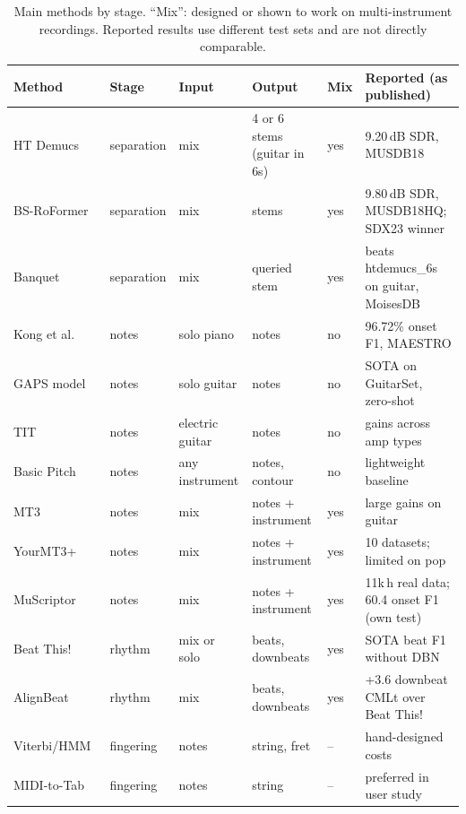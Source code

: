 \begin{table}[t]
\centering
\caption{Main methods by stage. ``Mix'': designed or shown to work on
multi-instrument recordings. Reported results use different test sets and are
not directly comparable.}
\label{tab:methods}
\footnotesize
\setlength{\tabcolsep}{3.5pt}
\begin{tabular}{@{}llllll@{}}
\toprule
Method & Stage & Input & Output & Mix & Reported (as published) \\
\midrule
HT Demucs~\cite{rouard2023htdemucs} & separation & mix & 4 or 6 stems (guitar in 6s) & yes & 9.20\,dB SDR, MUSDB18 \\
BS-RoFormer~\cite{lu2023bsroformer} & separation & mix & stems & yes & 9.80\,dB SDR, MUSDB18HQ; SDX23 winner \\
Banquet~\cite{watcharasupat2024banquet} & separation & mix & queried stem & yes & beats htdemucs\_6s on guitar, MoisesDB \\
Kong et al.~\cite{kong2021highres} & notes & solo piano & notes & no & 96.72\% onset F1, MAESTRO \\
GAPS model~\cite{riley2024gaps} & notes & solo guitar & notes & no & SOTA on GuitarSet, zero-shot \\
TIT~\cite{chen2025egdbpg} & notes & electric guitar & notes & no & gains across amp types \\
Basic Pitch~\cite{bittner2022basicpitch} & notes & any instrument & notes, contour & no & lightweight baseline \\
MT3~\cite{gardner2022mt3} & notes & mix & notes + instrument & yes & large gains on guitar \\
YourMT3+~\cite{chang2024yourmt3} & notes & mix & notes + instrument & yes & 10 datasets; limited on pop \\
MuScriptor~\cite{rouard2026muscriptor} & notes & mix & notes + instrument & yes & 11k\,h real data; 60.4 onset F1 (own test) \\
Beat This!~\cite{foscarin2024beatthis} & rhythm & mix or solo & beats, downbeats & yes & SOTA beat F1 without DBN \\
AlignBeat~\cite{ahn2025alignbeat} & rhythm & mix & beats, downbeats & yes & +3.6 downbeat CMLt over Beat This! \\
Viterbi/HMM~\cite{sayegh1989fingering,hori2016minimax} & fingering & notes & string, fret & -- & hand-designed costs \\
MIDI-to-Tab~\cite{edwards2024miditotab} & fingering & notes & string & -- & preferred in user study \\

\end{tabular}
\end{table}
